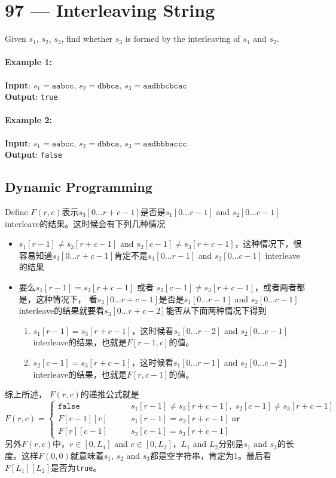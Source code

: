 \section{97 --- Interleaving String}
Given $s_1$, $s_2$, $s_3$, find whether $s_3$ is formed by the interleaving of $s_1$ and $s_2$.
\paragraph{Example 1:}
\begin{flushleft}
\textbf{Input}: $s_1 = \texttt{aabcc}$, $s_2 = \texttt{dbbca}$, $s_3 = \texttt{aadbbcbcac}$
\\
\textbf{Output}: \texttt{true}
\end{flushleft}
\paragraph{Example 2:}
\begin{flushleft}
\textbf{Input}: $s_1 = \texttt{aabcc}$, $s_2 = \texttt{dbbca}$, $s_3 = \texttt{aadbbbaccc}$
\\
\textbf{Output}: \texttt{false}
\end{flushleft}
\subsection{Dynamic Programming}
\begin{CJK*}{UTF8}{gbsn}
Define $F(r,c)$表示$s_3[0\ldots r+c-1]$是否是$s_1[0\ldots r-1]$ and $s_2[0\ldots c-1]$ interleave的结果。这时候会有下列几种情况
\begin{itemize}
\item $s_1[r-1]\neq s_3[r+c-1]$ and $s_2[c-1]\neq s_3[r+c-1]$，这种情况下，很容易知道$s_3[0\ldots r+c-1]$肯定不是$s_1[0\ldots r-1]$ and $s_2[0\ldots c-1]$ interleave的结果
\item 要么$s_1[r-1] = s_3[r+c-1]$ 或者 $s_2[c-1]\neq s_3[r+c-1]$，或者两者都是，这种情况下， 看$s_3[0\ldots r+c-1]$是否是$s_1[0\ldots r-1]$ and $s_2[0\ldots c-1]$ interleave的结果就要看$s_3[0\ldots r+c-2]$能否从下面两种情况下得到
\begin{enumerate}
\item $s_1[r-1] = s_3[r+c-1]$，这时候看$s_1[0\ldots r-2]$ and $s_2[0\ldots c-1]$ interleave的结果，也就是$F[r-1,c]$的值。
\item $s_2[c-1] = s_3[r+c-1]$，这时候看$s_1[0\ldots r-1]$ and $s_2[0\ldots c-2]$ interleave的结果，也就是$F[r,c-1]$的值。
\end{enumerate}
\end{itemize}
综上所述， $F(r,c)$的递推公式就是
\[
F(r,c) = 
\begin{cases}
\texttt{false} &\qquad s_1[r-1]\neq s_3[r+c-1], \;s_2[c-1]\neq s_3[r+c-1]\\
F[r-1][c] &\qquad s_1[r-1]= s_3[r+c-1] \; \texttt{or} \\
F[r][c-1] &\qquad s_2[c-1]= s_3[r+c-1] 
\end{cases}
\]
另外$F(r,c)$中，$r \in [0, L_1]$ and $c\in[0, L_2]$，$L_1$ and $L_2$分别是$s_1$ and $s_2$的长度。这样$F(0,0)$就意味着$s_1$, $s_2$ and $s_3$都是空字符串，肯定为1。最后看$F[L_1][L_2]$是否为\texttt{true}。
\end{CJK*}


